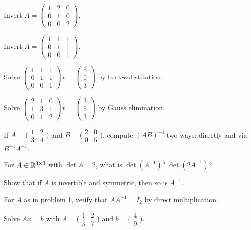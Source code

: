 \begin{problems}
    \item Invert $A = \begin{pmatrix} 1 & 2 & 0 \\ 0 & 1 & 0 \\ 0 & 0 & 2 \end{pmatrix}$.
    \item Invert $A = \begin{pmatrix} 1 & 1 & 1 \\ 0 & 1 & 1 \\ 0 & 0 & 1 \end{pmatrix}$.
    \item Solve $\begin{pmatrix} 1 & 1 & 1 \\ 0 & 1 & 1 \\ 0 & 0 & 1 \end{pmatrix} x = \begin{pmatrix} 6 \\ 5 \\ 3 \end{pmatrix}$ by back-substitution.
    \item Solve $\begin{pmatrix} 2 & 1 & 0 \\ 1 & 3 & 1 \\ 0 & 1 & 2 \end{pmatrix} x = \begin{pmatrix} 3 \\ 5 \\ 3 \end{pmatrix}$ by Gauss elimination.
    \item If $A = \bigl(\begin{smallmatrix} 1 & 2 \\ 3 & 4 \end{smallmatrix}\bigr)$ and $B = \bigl(\begin{smallmatrix} 2 & 0 \\ 0 & 5 \end{smallmatrix}\bigr)$, compute $(A B)^{-1}$ two ways: directly and via $B^{-1} A^{-1}$.
    \item For $A \in \mathbb{R}^{3 \times 3}$ with $\det A = 2$, what is $\det(A^{-1})$? $\det(2 A^{-1})$?
    \item Show that if $A$ is invertible and symmetric, then so is $A^{-1}$.
    \item For $A$ as in problem 1, verify that $A A^{-1} = I_{2}$ by direct multiplication.
    \item Solve $A x = b$ with $A = \bigl(\begin{smallmatrix} 1 & 2 \\ 3 & 7 \end{smallmatrix}\bigr)$ and $b = \bigl(\begin{smallmatrix} 4 \\ 9 \end{smallmatrix}\bigr)$.

\end{problems}
